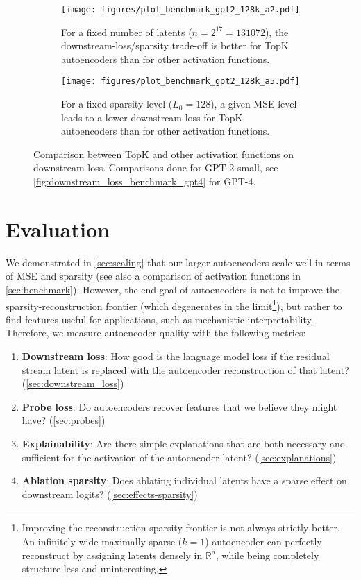

\begin{figure}
    \centering
    \begin{subfigure}[b]{0.45\textwidth}
    \texttt{[image: figures/plot\_benchmark\_gpt2\_128k\_a2.pdf]}%
    \caption{For a fixed number of latents ($n=2^{17}=131072$), the downstream-loss/sparsity trade-off is better for TopK autoencoders than for other activation functions.}
    \end{subfigure}
    \hspace{10pt}
    \begin{subfigure}[b]{0.45\textwidth}
    \texttt{[image: figures/plot\_benchmark\_gpt2\_128k\_a5.pdf]}%
     \caption{For a fixed sparsity level ($L_0 = 128$), a given MSE level leads to a lower downstream-loss for TopK autoencoders than for other activation functions.}
     \end{subfigure}
     \caption{Comparison between TopK and other activation functions on downstream loss.  Comparisons done for GPT-2 small, see \autoref{fig:downstream_loss_benchmark_gpt4} for GPT-4.}
    \label{fig:downstream_loss_benchmark}
\end{figure}

\section{Evaluation}
\label{sec:metrics}




We demonstrated in \autoref{sec:scaling} that our larger autoencoders scale well in terms of MSE and sparsity (see also a comparison of activation functions in \autoref{sec:benchmark}). However, the end goal of autoencoders is not to improve the sparsity-reconstruction frontier (which degenerates in the limit\footnote{Improving the reconstruction-sparsity frontier is not always strictly better. An infinitely wide maximally sparse ($k = 1$) autoencoder can perfectly reconstruct by assigning latents densely in $\mathbb R^d$, while being completely structure-less and uninteresting.}), but rather to find features useful for applications, such as mechanistic interpretability.
Therefore, we measure autoencoder quality with the following metrics:

\begin{enumerate}
\item \textbf{Downstream loss}: How good is the language model loss if the residual stream latent is replaced with the autoencoder reconstruction of that latent? (\autoref{sec:downstream_loss})
\item \textbf{Probe loss}: Do autoencoders recover features that we believe they might have? (\autoref{sec:probes})
\item \textbf{Explainability}: Are there simple explanations that are both necessary and sufficient for the activation of the autoencoder latent? (\autoref{sec:explanations})
\item \textbf{Ablation sparsity}: Does ablating individual latents have a sparse effect on downstream logits? (\autoref{sec:effects-sparsity})
\end{enumerate}



